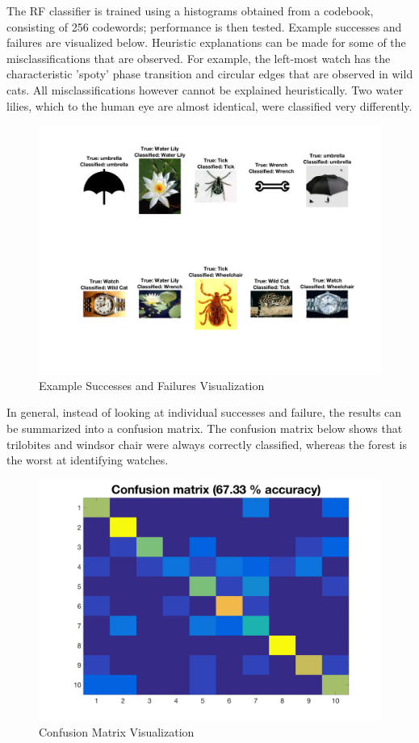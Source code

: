 \documentclass[a4paper,pra,twocolumn,10pt,aps,longbibliography,nobalancelastpage]{article}
\begin{document}
The RF classifier is trained using a histograms obtained from a codebook, consisting of 256 codewords; performance is then tested. Example successes and failures are visualized below.  Heuristic explanations can be made for some of the misclassifications that are observed. For example, the left-most watch has the characteristic 'spoty' phase transition and circular edges that are observed in wild cats. All misclassifications however cannot be explained heuristically. Two water lilies, which to the human eye are almost identical, were classified very differently. 

\begin{figure}[H]
	\centering
    \includegraphics[width=\columnwidth]{images}
    \caption{Example Successes and Failures Visualization}
\end{figure}

In general, instead of looking at individual successes and failure, the results can be summarized into a confusion matrix. The confusion matrix below shows that trilobites and windsor chair were always correctly classified, whereas the forest is the worst at identifying watches. 

\begin{figure}[H]
	\centering
    \includegraphics[width=0.49\columnwidth]{confus}    
    \caption{Confusion Matrix Visualization}
\end{figure}
\end{document}
